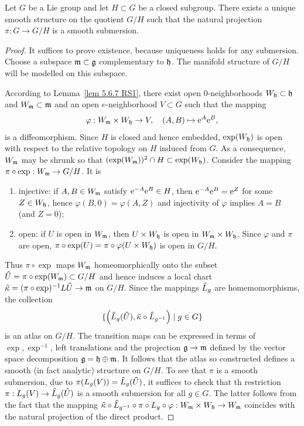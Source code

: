 \begin{thm}
    Let $G$ be a Lie group and let $H\subset G$ be a closed subgroup. There exists a unique smooth structure on the quotient $G\slash H$ such that the natural projection $\pi:G\to G\slash H$ is a smooth submersion.
\end{thm}
\begin{proof}
    It suffices to prove existence, because uniqueness holds for any submersion. Choose a subspace $\mathfrak{m}\subset \mathfrak{g}$ complementary to $\mathfrak{h}$. The manifold structure of $G\slash H$ will be modelled on this subspace.

    According to Lemma~\ref{lem 5.6.7 RS1}, there exist open $0$-neighborhoods $W_{\mathfrak{h}}\subset\mathfrak{h}$ and $W_{\mathfrak{m}}\subset\mathfrak{m}$  and an open $e$-neighborhood $V\subset G$ such that the mapping
    \[\varphi:W_{\mathfrak{m}}\times W_{\mathfrak{h}}\to V,\quad (A,B)\mapsto \mathrm{e}^A \mathrm{e}^B,\]
    is a diffeomorphism. Since $H$ is closed and hence embedded, $\exp (W_{\mathfrak{h}})$ is open with respect to the relative topology on $H$ induced from $G$. As a consequence, $W_{\mathfrak{m}}$ may be shrunk so that $(\exp(W_{\mathfrak{m}}))^2\cap H\subset \exp(W_{\mathfrak{h}})$. Consider the mapping $\pi\circ \exp:W_{\mathfrak{m}}\to G\slash H$. It is
    \begin{enumerate}[label=(\alph*)]
        \item injective: if $A,B\in W_{\mathfrak{m}}$ satisfy $\mathrm{e}^{-A}\mathrm{e}^B\in H$, then $\mathrm{e}^{-A}\mathrm{e}^B=\mathrm{e}^Z$ for some $Z\in W_{\mathfrak{h}}$, hence $\varphi(B,0)=\varphi(A,Z)$ and injectivity of $\varphi$ implies $A=B$ (and $Z=0$);
        \item open: if $U$ is open in $W_{\mathfrak{m}}$, then $U\times W_{\mathfrak{h}}$ is open in $W_{\mathfrak{m}}\times W_{\mathfrak{h}}$. Since $\varphi$ and $\pi$ are open, $\pi\circ\exp(U)=\pi\circ\varphi(U\times W_{\mathfrak{h}})$ is open in $G\slash H$.
    \end{enumerate}
    Thus $\pi\circ\exp$ maps $W_{\mathfrak{m}}$ homeomorphically onto the subset $\wh{U}=\pi\circ\exp(W_\frakm)\subset G\slash H$ and hence induces a local chart $\wh{\kappa}=(\pi\circ\exp)^{-1}L\wh{U}\to \frakm$ on $G\slash H$. Since the mappings $\wh{L}_g$ are homemomorphisms, the collection
    \[\{\left(\wh{L}_g(\wh{U}),\wh{\kappa}\circ \wh{L}_{g^{-1}}\right)\mid g\in G\}\]
    is an atlas on $G\slash H$. The transition maps can be expressed in terms of $\exp,\exp^{-1}$, left translations and the projection $\mathfrak{g}\to\mathfrak{m}$ defined by the vector space decomposition $\mathfrak{g}=\mathfrak{h}\oplus\mathfrak{m}$. It follows that the atlas so constructed defines a smooth (in fact analytic) structure on $G\slash H$. To see that $\pi$ is a smooth submersion, due to $\pi(L_g(V))=\wh{L}_g(\wh{U})$, it suffices to check that th restriction $\pi:L_g(V)\to \wh{L}_g(\wh{U})$ is a smooth submersion for all $g\in G$. The latter follows from the fact that the mapping $\wh{\kappa}\circ\wh{L}_{g^{-1}}\circ\pi\circ L_g\circ\varphi:W_\frakm\times W_\frakh\to W_\frakm$ coincides with the natural projection of the direct product.
\end{proof}




